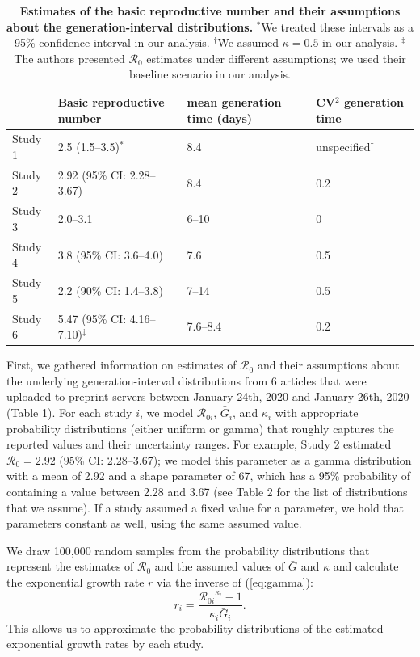 \documentclass[12pt]{article}
\newcommand{\eref}[1]{(\ref{eq:#1})}
\begin{document}
\begin{table}[t]
\begin{center}
\footnotesize
\begin{tabular}{l|l|l|l}
 & Basic reproductive number & mean generation time (days) & CV$^2$ generation time \\
\hline
Study 1 & 2.5 (1.5--3.5)$^\ast$ & 8.4 & unspecified$^\dagger$ \\
\hline
Study 2 & 2.92 (95\% CI: 2.28--3.67) & 8.4 & 0.2 \\
\hline
Study 3 & 2.0--3.1 & 6--10 & 0 \\
\hline
Study 4 & 3.8 (95\% CI: 3.6--4.0) & 7.6 & 0.5 \\
\hline
Study 5 & 2.2 (90\% CI: 1.4--3.8) & 7--14 & 0.5\\
\hline
Study 6 & 5.47 (95\% CI: 4.16--7.10)$^\ddagger$ & 7.6--8.4 & 0.2
\end{tabular}
\end{center}
\caption{
\textbf{Estimates of the basic reproductive number and their assumptions about the generation-interval distributions.}
$^\ast$We treated these intervals as a 95\% confidence interval in our analysis.
$^\dagger$We assumed $\kappa = 0.5$ in our analysis.
$^\ddagger$The authors presented $\mathcal R_0$ estimates under different assumptions; we used their baseline scenario in our analysis.
}
\end{table}

First, we gathered information on estimates of $\mathcal R_0$ and their
assumptions about the underlying generation-interval distributions from
6 articles that were uploaded to
preprint servers between January 24th, 2020 and January 26th, 2020 (Table 1).
For each study $i$, we model $\mathcal R_{0i}$, $\bar G_i$, and $\kappa_i$ with appropriate probability distributions (either uniform or gamma) that roughly captures the reported values and their uncertainty ranges.
For example, Study 2 estimated $\mathcal R_0 = 2.92$ (95\% CI: 2.28--3.67);
we model this parameter as a gamma distribution with a mean of 2.92 and a shape parameter of 67, which has a 95\% probability of containing a value between 2.28 and 3.67 (see Table 2 for the list of distributions that we assume).
If a study assumed a fixed value for a parameter, we hold that parameters constant as well, using the same assumed value.

We draw 100,000 random samples from the probability distributions that represent the estimates of $\mathcal R_0$ and the assumed values of $\bar G$ and $\kappa$
and calculate the exponential growth rate $r$ via the inverse of \eref{gamma}:
\begin{equation}
r_i = \frac{{\mathcal R_{0i}}^{\kappa_i} - 1}{\kappa_i \bar{G}_i}.
\end{equation}
This allows us to approximate the probability distributions of the estimated exponential growth rates by each study.
\end{document}
